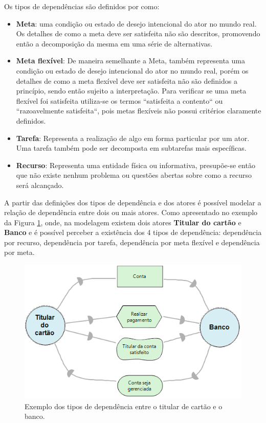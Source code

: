 Os tipos de dependências são definidos por \cite{istarwiki20} como: 

\begin{itemize}
	\item \textbf{Meta}: uma condição ou estado de desejo intencional do ator no mundo real. Os detalhes de como a meta deve ser satisfeita não são descritos, promovendo então a decomposição da mesma em uma série de alternativas.   
	\item \textbf{Meta flexível}: De maneira semelhante a Meta, também representa uma condição ou estado de desejo intencional do ator no mundo real, porém os detalhes de como a meta flexível deve ser satisfeita não são definidos a princípio, sendo então sujeito a interpretação. Para verificar se uma meta flexível foi satisfeita utiliza-se os termos ``satisfeita a contento`` ou ``razoavelmente satisfeita``, pois metas flexíveis não possui critérios claramente definidos. 
	\item \textbf{Tarefa}: Representa a realização de algo em forma particular por um ator. Uma tarefa também pode ser decomposta em subtarefas mais específicas. 
	\item \textbf{Recurso}: Representa uma entidade física ou informativa, presupõe-se então que não existe nenhum problema ou questões abertas sobre como a recurso será alcançado. 
\end{itemize}

A partir das definições dos tipos de dependência e dos atores é possível modelar a relação de dependência entre dois ou mais atores. Como apresentado no exemplo da Figura \ref{exemploTipoDeDepencia}, onde, na modelagem existem dois atores \textbf{Titular do cartão} e \textbf{Banco} e é possível perceber a existência dos 4 tipos de dependência: dependência por recurso, dependência por tarefa, dependência por meta flexível e dependência por meta.  

\begin{figure}[h!]
	\centering
	\includegraphics[keepaspectratio=true,scale=1.0]{figuras/ExemploTiposDeDependecias.PNG}
	\caption{Exemplo dos tipos de dependência entre o titular de cartão e o banco.}
	\label{exemploTipoDeDepencia}
\end{figure} 

